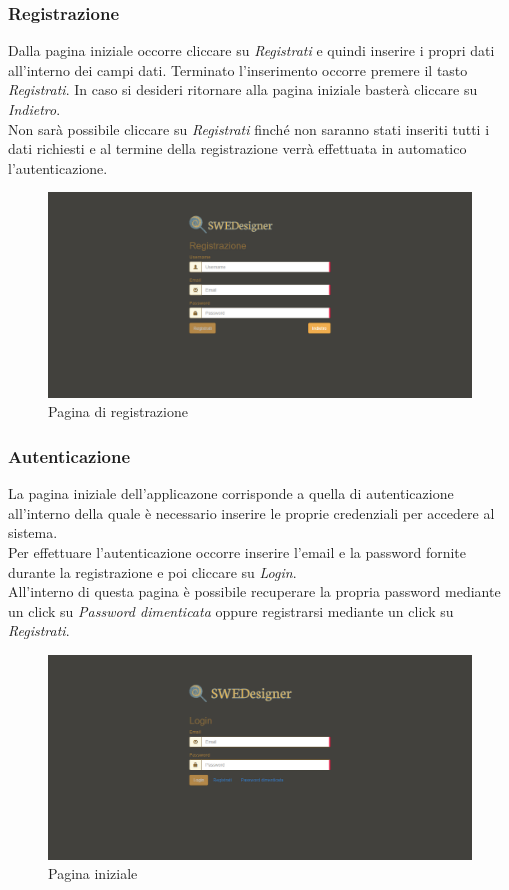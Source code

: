 \subsubsection{Registrazione}
Dalla pagina iniziale occorre cliccare su \textit{Registrati} e quindi inserire i propri dati all'interno dei campi dati. Terminato l'inserimento occorre premere il tasto \textit{Registrati}. In caso si desideri ritornare alla pagina iniziale basterà cliccare su \textit{Indietro}.\\
Non sarà possibile cliccare su \textit{Registrati} finché non saranno stati inseriti tutti i dati richiesti e al termine della registrazione verrà effettuata in automatico l'autenticazione.\\
\begin{figure}[H]
	\centering
		\includegraphics[width=1\linewidth]{res/img/registrazione.png}
	\caption{Pagina di registrazione}
\end{figure}
\newpage

\subsubsection{Autenticazione}
La pagina iniziale dell'applicazone corrisponde a quella di autenticazione all'interno della quale è necessario inserire le proprie credenziali per accedere al sistema.\\
Per effettuare l'autenticazione occorre inserire l'email e la password fornite durante la registrazione e poi cliccare su \textit{Login}.\\
All'interno di questa pagina è possibile recuperare la propria password mediante un click su \emph{Password dimenticata} oppure registrarsi mediante un click su \emph{Registrati}.\\
\begin{figure}[H]
	\centering
		\includegraphics[width=1\linewidth]{res/img/autenticazione.png}
	\caption{Pagina iniziale}
\end{figure}
\newpage

